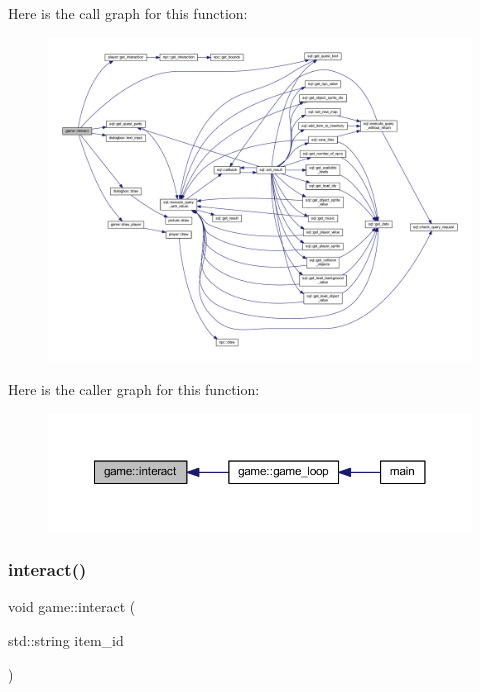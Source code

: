 Here is the call graph for this function\+:
\nopagebreak
\begin{figure}[H]
\begin{center}
\leavevmode
\includegraphics[width=350pt]{classgame_a61adfafa4d31548fc94c853f10b9bf3b_cgraph}
\end{center}
\end{figure}
Here is the caller graph for this function\+:
\nopagebreak
\begin{figure}[H]
\begin{center}
\leavevmode
\includegraphics[width=350pt]{classgame_a61adfafa4d31548fc94c853f10b9bf3b_icgraph}
\end{center}
\end{figure}
\mbox{\label{classgame_aa78cf955c292ac2bd75fa385a946cd6e}} 
\subsubsection{\texorpdfstring{interact()}{interact()}\hspace{0.1cm}{\footnotesize\ttfamily [2/2]}}
{\footnotesize\ttfamily void game\+::interact (\begin{DoxyParamCaption}\item[{std\+::string}]{item\+\_\+id }\end{DoxyParamCaption})\hspace{0.3cm}{\ttfamily [private]}}



